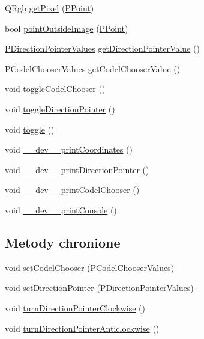 \begin{CompactItemize}
QRgb \hyperlink{classPCodePointer_e9f3396a98b84d090e820ad37c6dca21}{getPixel} (\hyperlink{structstruct__point}{PPoint})
\item 
bool \hyperlink{classPCodePointer_a9e836354b61f96ed39208c8b37d57d3}{pointOutsideImage} (\hyperlink{structstruct__point}{PPoint})
\item 
\hyperlink{penums_8h_6d3256570150238c718cbbb5f81c82df}{PDirectionPointerValues} \hyperlink{classPCodePointer_e0461a3d72af876b5b3c838a8b45a729}{getDirectionPointerValue} ()
\item 
\hyperlink{penums_8h_59dc57d526e2ce263bdf851c0d4fef3e}{PCodelChooserValues} \hyperlink{classPCodePointer_529b0f2f65c1d17082d755813fec0194}{getCodelChooserValue} ()
\item 
void \hyperlink{classPCodePointer_56d2ef632779fbe64937030e82b027d1}{toggleCodelChooser} ()
\item 
void \hyperlink{classPCodePointer_4aab1f30e01bb0fb3d78b5e6aa93535c}{toggleDirectionPointer} ()
\item 
void \hyperlink{classPCodePointer_5b34ab0f6bb3ddb3bd7e44a7d9a613ca}{toggle} ()
\item 
void \hyperlink{classPCodePointer_ce0986ca3dc000a06a0155d20cd83d26}{\_\-\_\-dev\_\-\_\-printCoordinates} ()
\item 
void \hyperlink{classPCodePointer_103c79ebd3257261d5c72322bc4eb742}{\_\-\_\-dev\_\-\_\-printDirectionPointer} ()
\item 
void \hyperlink{classPCodePointer_21810c2cdb66ea83cabafde33e8a0206}{\_\-\_\-dev\_\-\_\-printCodelChooser} ()
\item 
void \hyperlink{classPCodePointer_fe765c0487ab59dbbbdd47b78842bbcb}{\_\-\_\-dev\_\-\_\-printConsole} ()
\end{CompactItemize}
\subsection*{Metody chronione}
\begin{CompactItemize}
\item 
void \hyperlink{classPCodePointer_b5c13bf294dddd672ca9fe7675eb258b}{setCodelChooser} (\hyperlink{penums_8h_59dc57d526e2ce263bdf851c0d4fef3e}{PCodelChooserValues})
\item 
void \hyperlink{classPCodePointer_0b97bd6b4383e976e54c5738178c7815}{setDirectionPointer} (\hyperlink{penums_8h_6d3256570150238c718cbbb5f81c82df}{PDirectionPointerValues})
\item 
void \hyperlink{classPCodePointer_a3ad29e6327d54faf0b081892e720aca}{turnDirectionPointerClockwise} ()
\item 
void \hyperlink{classPCodePointer_3f43e8205a0554bf7baa3821e01ab4a2}{turnDirectionPointerAnticlockwise} ()
\end{CompactItemize}
